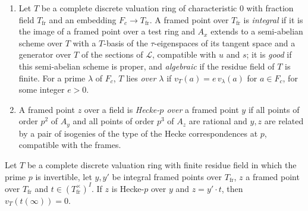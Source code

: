 \begin{definition}
\begin{enumerate}[label=(\alph*)]
\item Let $T$ be a complete discrete valuation ring of characteristic $0$ with fraction field $T_{\mathrm{fr}}$ and an embedding $F_c\to T_{\mathrm{fr}}$. A
framed point over $T_{\mathrm{fr}}$ is \emph{integral} if it is the image of a framed point over a test ring and $A_x$ extends to a semi-abelian scheme
over $T$ with a $T$-basis of the $\tau$-eigenspaces of its tangent space and a generator over $T$ of the sections of $\mathcal L$, compatible with
$u$ and $s$; it is \emph{good} if this semi-abelian scheme is proper, and \emph{algebraic} if the residue field of $T$ is finite. For a prime $\lambda$
of $F_c$, $T$ lies \emph{over $\lambda$} if $v_T(a)=e\,v_\lambda(a)$ for $a\in F_c$, for some integer $e>0$.
\item A framed point $z$ over a field is \emph{Hecke-$p$ over} a framed point $y$ if all points of order $p^2$ of $A_y$ and all points of order $p^3$
of $A_z$ are rational and $y,z$ are related by a pair of isogenies of the type of the Hecke correspondences at $p$, compatible with the frames.
\end{enumerate}
\end{definition}

\begin{lemma}\label{pf:liftinj:thetaunit}
Let $T$ be a complete discrete valuation ring with finite residue field in which the prime $p$ is invertible, let $y,y'$ be integral framed points
over $T_{\mathrm{fr}}$, $z$ a framed point over $T_{\mathrm{fr}}$ and $t\in(T_{\mathrm{fr}}^\times)^I$. If $z$ is Hecke-$p$ over $y$ and $z=y'\cdot t$,
then $v_T(t(\infty))=0$.
\end{lemma}

